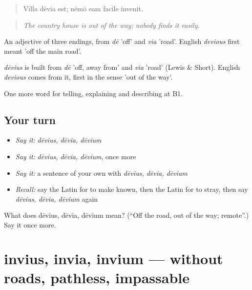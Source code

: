 \begin{quote}
Vīlla dēvia est; nēmō eam facile invenit.
\end{quote}

\begin{quote}
\emph{The country house is out of the way; nobody finds it easily.}
\end{quote}

An adjective of three endings, from \emph{dē} 'off' and \emph{via} 'road'. English \emph{devious} first meant 'off the main road'.

\begin{cousinweb}
\emph{dēvius} is built from \emph{dē} 'off, away from' and \emph{via} 'road' (Lewis \& Short). English \emph{devious} comes from it, first in the sense 'out of the way'.
\end{cousinweb}

\begin{grammarlens}[title={What you've built}]
One more word for telling, explaining and describing at B1.
\end{grammarlens}

\subsection*{Your turn}
\begin{itemize}
\raggedright
  \item \emph{Say it:} \emph{dēvius, dēvia, dēvium}
  \item \emph{Say it:} \emph{dēvius, dēvia, dēvium}, once more
  \item \emph{Say it:} a sentence of your own with \emph{dēvius, dēvia, dēvium}
  \item \emph{Recall:} say the Latin for to make known, then the Latin for to stray, then say \emph{dēvius, dēvia, dēvium} again
\end{itemize}

\begin{tcolorbox}[breakable,colback=teal!4,colframe=teal!35!black,title={Before you move on}]
What does dēvius, dēvia, dēvium mean? (\textquotedblleft{}Off the road, out of the way; remote\textquotedblright{}.) Say it once more.
\end{tcolorbox}
\section[invius, invia, invium]{invius, invia, invium — without roads, pathless, impassable}

\label{lesson:LA-C452-invius}



